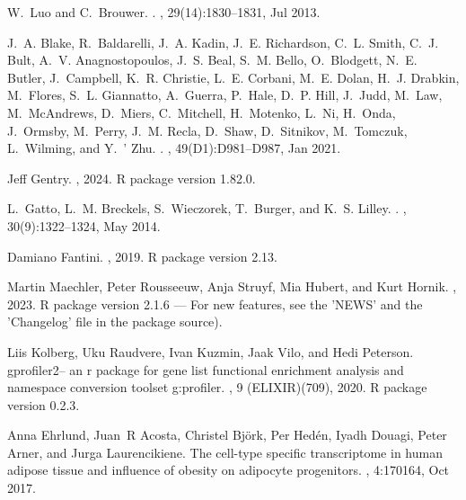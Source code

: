 \documentclass[
]{article}
\begin{document}
\begin{thebibliography}{100}
W.~Luo and C.~Brouwer.
.
, 29(14):1830--1831, Jul 2013.

J.~A. Blake, R.~Baldarelli, J.~A. Kadin, J.~E. Richardson, C.~L. Smith, C.~J.
  Bult, A.~V. Anagnostopoulos, J.~S. Beal, S.~M. Bello, O.~Blodgett, N.~E.
  Butler, J.~Campbell, K.~R. Christie, L.~E. Corbani, M.~E. Dolan, H.~J.
  Drabkin, M.~Flores, S.~L. Giannatto, A.~Guerra, P.~Hale, D.~P. Hill, J.~Judd,
  M.~Law, M.~McAndrews, D.~Miers, C.~Mitchell, H.~Motenko, L.~Ni, H.~Onda,
  J.~Ormsby, M.~Perry, J.~M. Recla, D.~Shaw, D.~Sitnikov, M.~Tomczuk,
  L.~Wilming, and Y.~' Zhu.
.
, 49(D1):D981--D987, Jan 2021.

Jeff Gentry.
, 2024.
\newblock R package version 1.82.0.

L.~Gatto, L.~M. Breckels, S.~Wieczorek, T.~Burger, and K.~S. Lilley.
.
, 30(9):1322--1324, May 2014.

Damiano Fantini.
, 2019.
\newblock R package version 2.13.

Martin Maechler, Peter Rousseeuw, Anja Struyf, Mia Hubert, and Kurt Hornik.
, 2023.
\newblock R package version 2.1.6 --- For new features, see the 'NEWS' and the
  'Changelog' file in the package source).

Liis Kolberg, Uku Raudvere, Ivan Kuzmin, Jaak Vilo, and Hedi Peterson.
\newblock gprofiler2-- an r package for gene list functional enrichment
  analysis and namespace conversion toolset g:profiler.
, 9 (ELIXIR)(709), 2020.
\newblock R package version 0.2.3.

Anna Ehrlund, Juan~R Acosta, Christel Bj{\"o}rk, Per Hed{\'e}n, Iyadh Douagi,
  Peter Arner, and Jurga Laurencikiene.
\newblock The cell-type specific transcriptome in human adipose tissue and
  influence of obesity on adipocyte progenitors.
, 4:170164, Oct 2017.


\end{thebibliography}
\end{document}

